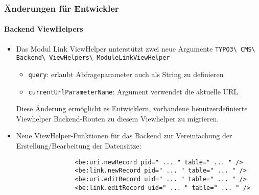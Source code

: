 \begin{frame}[fragile]
	\frametitle{Änderungen für Entwickler}
	\framesubtitle{Backend ViewHelpers}


	\begin{itemize}
		\item Das Modul Link ViewHelper unterstützt zwei neue Argumente\newline
			\small
				\texttt{TYPO3\textbackslash
					CMS\textbackslash
					Backend\textbackslash
					ViewHelpers\textbackslash
					ModuleLinkViewHelper}
			\normalsize

			\begin{itemize}
				\small
				\item \texttt{query}: erlaubt Abfrageparameter auch als String zu definieren
				\item \texttt{currentUrlParameterName}: Argument verwendet die aktuelle URL
			\end{itemize}

			Diese Änderung ermöglicht es Entwicklern, vorhandene benutzerdefinierte Viewhelper Backend-Routen
			zu diesem Viewhelper zu migrieren.

		\item Neue ViewHelper-Funktionen für das Backend zur Vereinfachung der Erstellung/Bearbeitung der Datensätze:

			\begin{lstlisting}
				<be:uri.newRecord pid=" ... " table=" ... " />
				<be:link.newRecord pid=" ... " table=" ... " />
				<be:uri.editRecord uid=" ... " table=" ... " />
				<be:link.editRecord uid=" ... " table=" ... " />
			\end{lstlisting}

	\end{itemize}

\end{frame}


